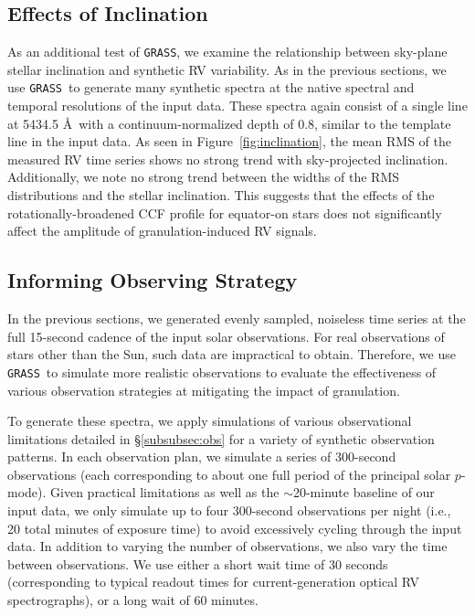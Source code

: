 \documentclass[twocolumn]{aastex63}
\newcommand{\grass}{\texttt{GRASS}}
\newcommand{\revise}[1]{#1}
\newcommand{\revisetwo}[1]{#1}
\begin{document}
\subsection{Effects of Inclination} \label{subsec:inc}


As an additional test of \grass, we examine the relationship between sky-plane stellar inclination and synthetic RV variability. As in the previous sections, we use \grass\ to generate many synthetic spectra at the native spectral and temporal resolutions of the input data. These spectra again consist of a single line at 5434.5 \AA\ with a continuum-normalized depth of 0.8, similar to the template line in the input data. As seen in Figure~\ref{fig:inclination}, the \revise{mean} RMS of the measured RV \revise{time series} shows no strong trend with sky-projected inclination. Additionally, we note no strong trend between the \revise{widths} of the RMS \revise{distributions} and the stellar inclination. This suggests that the effects of the rotationally-broadened CCF profile for equator-on stars does not significantly affect the amplitude of granulation-induced RV signals. \par 


\subsection{Informing Observing Strategy} \label{subsec:obs_strat}

In the previous sections, we generated evenly sampled, noiseless time series at the full 15-second cadence of the input solar observations. For real observations of stars other than the Sun, such data are impractical to obtain. Therefore, we use \grass\ to simulate more realistic observations to evaluate the effectiveness of various observation strategies at mitigating the impact of granulation. \par

To generate these spectra, we apply simulations of various observational limitations detailed in \S\ref{subsubsec:obs} for a variety of synthetic observation patterns. In each observation plan, we simulate a series of \revisetwo{300}-second observations (each corresponding to about \revisetwo{one full period} of the principal solar $p$-mode). Given practical limitations as well as the $\sim$20-minute baseline of our input data, we only simulate up to four \revisetwo{300}-second observations per night (i.e., \revisetwo{20} total minutes of exposure time) \revise{to avoid excessively cycling through the input data.} In addition to varying the number of observations, we also vary the time between observations. We use either a short wait time of 30 seconds (corresponding to typical readout \revise{times for current-generation optical RV spectrographs}), or a long wait of \revise{60 minutes}. \par 
\end{document}
